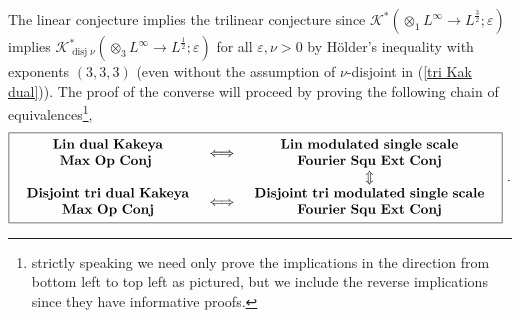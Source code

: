 \documentclass{amsart}%
\theoremstyle{plain}
\numberwithin{equation}{section}
\begin{document}
The linear conjecture implies the trilinear conjecture since $\mathcal{K}%
^{\ast}\left(  \otimes_{1}L^{\infty}\rightarrow L^{\frac{3}{2}};\varepsilon
\right)  $ implies $\mathcal{K}_{\operatorname*{disj}\nu}^{\ast}\left(
\otimes_{3}L^{\infty}\rightarrow L^{\frac{1}{2}};\varepsilon\right)  $ for all
$\varepsilon,\nu>0$ by H\"{o}lder's inequality with exponents $\left(
3,3,3\right)  $ (even without the assumption of $\nu$-disjoint in
(\ref{tri Kak dual})). The proof of the converse will proceed by proving the
following chain of equivalences\footnote{strictly speaking we need only prove
the implications in the direction from bottom left to top left as pictured,
but we include the reverse implications since they have informative proofs.},%
\begin{equation}
\fbox{$%
\begin{array}
[c]{ccc}%
\begin{array}
[c]{c}%
\mathbf{Lin\ dual\ Kakeya}\\
\mathbf{Max\ Op\ Conj\ }%
\end{array}
& \Longleftrightarrow &
\begin{array}
[c]{c}%
\mathbf{Lin\ modulated\ single\ scale}\\
\mathbf{Fourier\ Squ\ Ext\ Conj}%
\end{array}
\\
&  & \Updownarrow\\%
\begin{array}
[c]{c}%
\mathbf{Disjoint\ tri\ dual\ Kakeya}\\
\mathbf{Max\ Op\ Conj}%
\end{array}
& \Longleftrightarrow &
\begin{array}
[c]{c}%
\mathbf{Disjoint\ tri\ modulated\ single\ scale}\\
\mathbf{Fourier\ Squ\ Ext\ Conj}%
\end{array}
\end{array}
$}\ . \label{diag}%
\end{equation}
\end{document}
